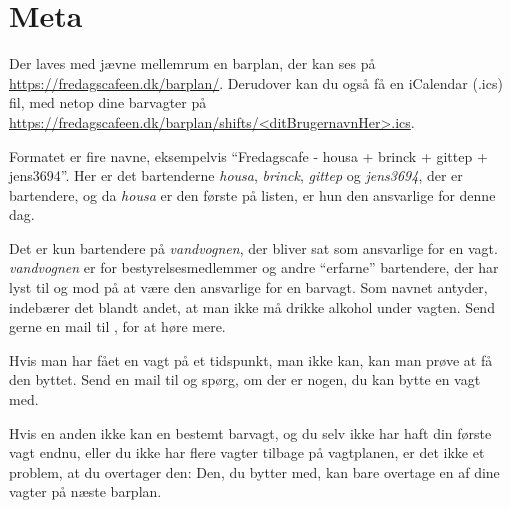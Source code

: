 \section{Meta}
\label{sec:meta}

Der laves med jævne mellemrum en barplan, der kan ses på
\url{https://fredagscafeen.dk/barplan/}. Derudover kan du også få en
iCalendar (.ics) fil, med netop dine barvagter på
\url{https://fredagscafeen.dk/barplan/shifts/<ditBrugernavnHer>.ics}.

Formatet er fire navne, eksempelvis ``Fredagscafe - housa + brinck +
gittep + jens3694''. Her er det bartenderne \emph{housa},
\emph{brinck}, \emph{gittep} og \emph{jens3694}, der er bartendere, og
da \emph{housa} er den første på listen, er hun den ansvarlige for
denne dag.

Det er kun bartendere på \emph{vandvognen}, der bliver sat som
ansvarlige for en vagt. \emph{vandvognen} er for bestyrelsesmedlemmer
og andre ``erfarne'' bartendere, der har lyst til og mod på at være
den ansvarlige for en barvagt. Som navnet antyder, indebærer det
blandt andet, at man ikke må drikke alkohol under vagten. Send gerne
en mail til , for at høre mere.

Hvis man har fået en vagt på et tidspunkt, man ikke kan, kan man prøve
at få den byttet. Send en mail til  og
spørg, om der er nogen, du kan bytte en vagt med.

Hvis en anden ikke kan en bestemt barvagt, og du selv ikke har haft
din første vagt endnu, eller du ikke har flere vagter tilbage på
vagtplanen, er det ikke et problem, at du overtager den: Den, du
bytter med, kan bare overtage en af dine vagter på næste barplan.



